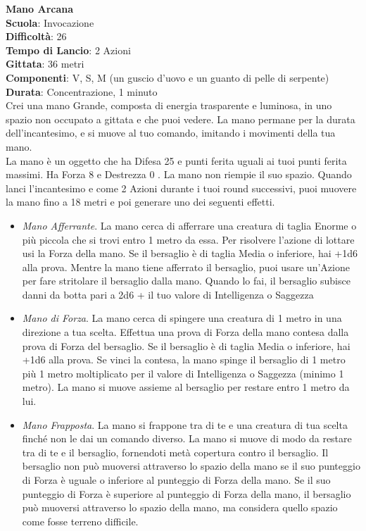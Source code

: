 \begin{multicols}{2}
\medskip\textbf{Mano Arcana}\\
\textbf{Scuola}: Invocazione\\
\textbf{Difficoltà}: 26\\
\textbf{Tempo di Lancio}: 2 Azioni\\
\textbf{Gittata}: 36 metri\\
\textbf{Componenti}: V, S, M (un guscio d'uovo e un guanto di pelle di serpente)\\
\textbf{Durata}: Concentrazione, 1 minuto\\
Crei una mano Grande, composta di energia trasparente e luminosa, in uno spazio non occupato a gittata e che puoi vedere. La mano permane per la durata dell'incantesimo, e si muove al tuo comando, imitando i movimenti della tua mano.\\
La mano è un oggetto che ha Difesa 25 e punti ferita uguali ai tuoi punti ferita massimi. Ha Forza 8 e Destrezza 0 . La mano non riempie il suo spazio.
Quando lanci l'incantesimo e come 2 Azioni durante i tuoi round successivi, puoi muovere la mano fino a 18 metri e poi generare uno dei seguenti effetti. 
\medskip
\begin{itemize}
\item
\textit{Mano Afferrante}. La mano cerca di afferrare una creatura di taglia Enorme o più piccola che si trovi entro 1 metro da essa. Per risolvere l'azione di lottare usi la Forza della mano. Se il bersaglio è di taglia Media o inferiore, hai +1d6 alla prova. Mentre la mano tiene afferrato il bersaglio, puoi usare un'Azione per fare stritolare il bersaglio dalla mano. Quando lo fai, il bersaglio subisce danni da botta pari a 2d6 + il tuo valore di Intelligenza o Saggezza
\item
\textit{Mano di Forza}. La mano cerca di spingere una creatura di 1 metro in una direzione a tua scelta. Effettua una prova di Forza della mano contesa dalla prova di Forza del bersaglio. Se il bersaglio è di taglia Media o inferiore, hai +1d6 alla prova. Se vinci la contesa, la mano spinge il bersaglio di 1 metro più 1 metro moltiplicato per il valore di Intelligenza o Saggezza (minimo 1 metro). La mano si muove assieme al bersaglio per restare entro 1 metro da lui.\\
\item
\textit{Mano Frapposta}. La mano si frappone tra di te e una creatura di tua scelta finché non le dai un comando diverso. La mano si muove di modo da restare tra di te e il bersaglio, fornendoti metà copertura contro il bersaglio. Il bersaglio non può muoversi attraverso lo spazio della mano se il suo punteggio di Forza è uguale o inferiore al punteggio di Forza della mano. Se il suo punteggio di Forza è superiore al punteggio di Forza della mano, il bersaglio può muoversi attraverso lo spazio della mano, ma considera quello spazio come fosse terreno difficile. \\

\end{itemize}
\end{multicols}
